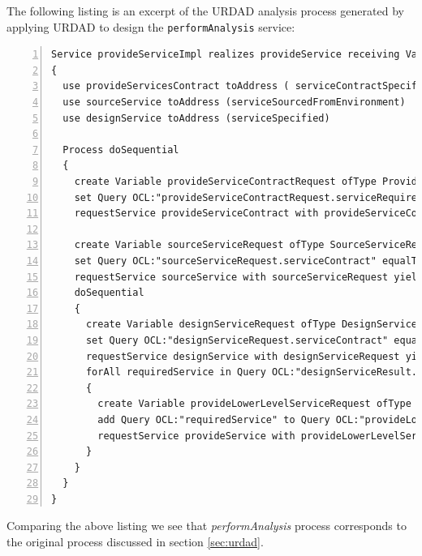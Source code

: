The following listing is an excerpt of the URDAD analysis process generated by applying URDAD to design the \verb+performAnalysis+ service:
\lstset{language=urdad,caption=Specifying the performAnalysis service in the textual URDAD DSL syntax.,label=serviceTextSyntax}
\begin{lstlisting}[numbers=left,escapechar=|]
Service provideServiceImpl realizes provideService receiving Variable provideServiceRequest ofType ProvideServiceRequest
{
  use provideServicesContract toAddress ( serviceContractSpecified serviceHasStakeHolders stakeholderRequirementsConsistent)
  use sourceService toAddress (serviceSourcedFromEnvironment)
  use designService toAddress (serviceSpecified)
        
  Process doSequential
  {
    create Variable provideServiceContractRequest ofType ProvideServiceContractRequest
    set Query OCL:"provideServiceContractRequest.serviceRequirements" equalTo Query OCL:"provideServiceRequest.serviceRequirements"
    requestService provideServiceContract with provideServiceContractRequest yielding Variable provideServiceContractResult ofType ProvideServiceContractResult raises (NoStakeholdersException InconsistentRequirementsException) 

    create Variable sourceServiceRequest ofType SourceServiceRequest
    set Query OCL:"sourceServiceRequest.serviceContract" equalTo Query OCL:"provideServiceContractResult.serviceContract"
    requestService sourceService with sourceServiceRequest yielding Variable sourceServiceResult ofType SourceServiceResult on NoRealizingServiceException
    doSequential
    {
      create Variable designServiceRequest ofType DesignServiceRequest
      set Query OCL:"designServiceRequest.serviceContract" equalTo Query OCL:"provideServiceContractResult.serviceContract"                
      requestService designService with designServiceRequest yielding Variable designServiceResult ofType DesignServiceResult
      forAll requiredService in Query OCL:"designServiceResult.service.requiredServices."
      {
        create Variable provideLowerLevelServiceRequest ofType ProvideServiceRequest
        add Query OCL:"requiredService" to Query OCL:"provideLowerLevelServiceRequest.serviceRequirements"
        requestService provideService with provideLowerLevelServiceRequest yielding variable provideLowerLevelServiceResult ofType ProvideServiceResult 
      } 
    } 
  }             
}
\end{lstlisting}

Comparing the above listing we see that \emph{performAnalysis} process corresponds to the original process discussed in section \ref{sec:urdad}.